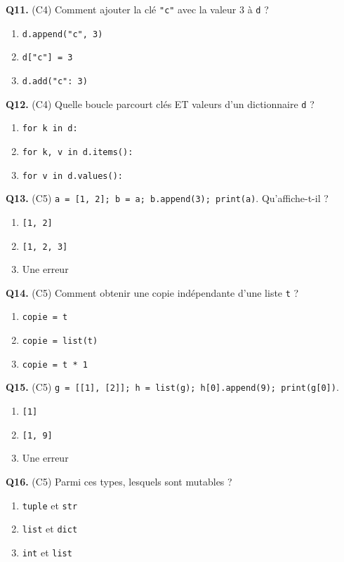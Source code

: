 \textbf{Q11.} (C4) Comment ajouter la clé \lstinline{"c"} avec la valeur 3 à \lstinline{d} ?
\begin{enumerate}[label=\Alph*.]
  \item \lstinline{d.append("c", 3)}
  \item \lstinline|d["c"] = 3|
  \item \lstinline{d.add("c": 3)}
\end{enumerate}

\textbf{Q12.} (C4) Quelle boucle parcourt clés ET valeurs d'un dictionnaire \lstinline{d} ?
\begin{enumerate}[label=\Alph*.]
  \item \lstinline{for k in d:}
  \item \lstinline{for k, v in d.items():}
  \item \lstinline{for v in d.values():}
\end{enumerate}

\textbf{Q13.} (C5) \lstinline{a = [1, 2]; b = a; b.append(3); print(a)}. Qu'affiche-t-il ?
\begin{enumerate}[label=\Alph*.]
  \item \lstinline{[1, 2]}
  \item \lstinline{[1, 2, 3]}
  \item Une erreur
\end{enumerate}

\textbf{Q14.} (C5) Comment obtenir une copie indépendante d'une liste \lstinline{t} ?
\begin{enumerate}[label=\Alph*.]
  \item \lstinline{copie = t}
  \item \lstinline{copie = list(t)}
  \item \lstinline{copie = t * 1}
\end{enumerate}

\textbf{Q15.} (C5) \lstinline{g = [[1], [2]]; h = list(g); h[0].append(9); print(g[0])}.
\begin{enumerate}[label=\Alph*.]
  \item \lstinline{[1]}
  \item \lstinline{[1, 9]}
  \item Une erreur
\end{enumerate}

\textbf{Q16.} (C5) Parmi ces types, lesquels sont mutables ?
\begin{enumerate}[label=\Alph*.]
  \item \lstinline{tuple} et \lstinline{str}
  \item \lstinline{list} et \lstinline{dict}
  \item \lstinline{int} et \lstinline{list}
\end{enumerate}
